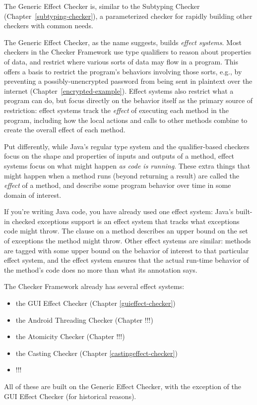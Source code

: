 \htmlhr
{}

The Generic Effect Checker is, similar to the Subtyping Checker (Chapter~\ref{subtyping-checker}), a parameterized checker for rapidly building other checkers with common needs.

The Generic Effect Checker, as the name suggests, builds \emph{effect systems}. 
Most checkers in the Checker Framework use type qualifiers to reason about properties of data, and restrict where various sorts of data may flow in a program. This offers a basis to restrict the program's behaviors involving those sorts, e.g., by preventing a possibly-unencrypted password from being sent in plaintext over the internet (Chapter~\ref{encrypted-example}).
Effect systems also restrict what a program can do, but focus directly on the behavior itself as the primary source of restriction: effect systems track the \emph{effect} of executing each method in the program, including how the local actions and calls to other methods combine to create the overall effect of each method.  

Put differently, while Java's regular type system and the qualifier-based checkers focus on the shape and properties of inputs and outputs of a method, effect systems focus on what might happen \emph{as code is running}. These extra things that might happen when a method runs (beyond returning a result) are called the \emph{effect} of a method, and describe some program behavior over time in some domain of interest.

If you're writing Java code, you have already used one effect system: Java's built-in checked exceptions support is an effect system that tracks what exceptions code might throw.  The  clause on a method describes an upper bound on the set of exceptions the method might throw.  Other effect systems are similar: methods are tagged with some upper bound on the behavior of interest to that particular effect system, and the effect system ensures that the actual run-time behavior of the method's code does no more than what its annotation says.

The Checker Framework already has several effect systems:
\begin{itemize}
    \item the GUI Effect Checker (Chapter \ref{guieffect-checker})
    \item the Android Threading Checker (Chapter !!!)
    \item the Atomicity Checker (Chapter !!!)
    \item the Casting Checker (Chapter \ref{castingeffect-checker})
    \item !!!
\end{itemize}
All of these are built on the Generic Effect Checker, with the exception of the GUI Effect Checker (for historical reasons).

